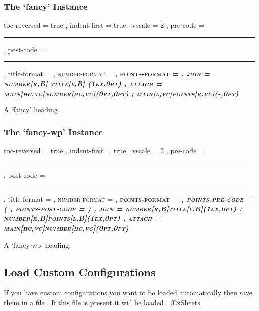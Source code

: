 \documentclass[DIV10,toc=index,toc=bib,numbers=noendperiod]{cnpkgdoc}
\begin{document}
\subsubsection{The `fancy' Instance}
\begin{beispiel}
  {
    toc-reversed     = true ,
    indent-first     = true ,
    vscale           = 2 ,
    pre-code         = \rule{\linewidth}{1pt} ,
    post-code        = \rule{\linewidth}{1pt} ,
    title-format     = \large\scshape\color{exsheetsred} ,
    number-format    = \large\bfseries\color{exsheetsblue} ,
    points-format    = \itshape ,
    join             = { number[r,B] title[l,B] (1ex,0pt) } ,
    attach           =
      {
        main[hc,vc]number[hc,vc](0pt,0pt) ;
        main[l,vc]points[r,vc](-\marginparsep,0pt)
      }
  }
\end{beispiel}
\begin{question}{1}
 A `fancy' heading. \sample
\end{question}

\subsubsection{The `fancy-wp' Instance}
\begin{beispiel}
  {
    toc-reversed     = true ,
    indent-first     = true ,
    vscale           = 2 ,
    pre-code         = \rule{\linewidth}{1pt} ,
    post-code        = \rule{\linewidth}{1pt} ,
    title-format     = \large\scshape\color{exsheetsred} ,
    number-format    = \large\bfseries\color{exsheetsblue} ,
    points-format    = \itshape ,
    points-pre-code  = ( ,
    points-post-code = ) ,
    join             =
      {
        number[r,B]title[l,B](1ex,0pt) ;
        number[r,B]points[l,B](1ex,0pt)
      } ,
    attach           = { main[hc,vc]number[hc,vc](0pt,0pt) }
  }
\end{beispiel}
\begin{question}{1}
 A `fancy-wp' heading. \sample
\end{question}

\subsection{Load Custom Configurations}
If you have custom configurations you want to be loaded automatically then save
them in a file . If this file is present it
will be loaded .
\secidx*{\ExSheets}[ExSheets]
\end{document}
